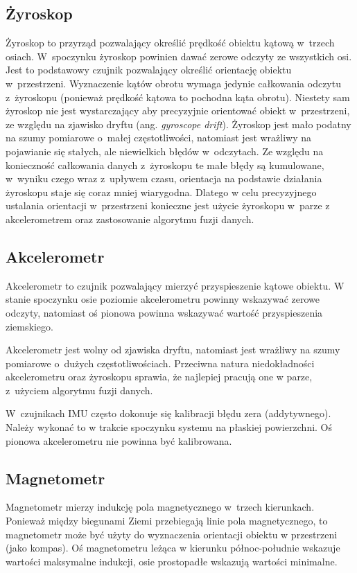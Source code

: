  \subsection{Żyroskop}
Żyroskop to przyrząd pozwalający określić prędkość obiektu kątową w~trzech
osiach.
W~spoczynku żyroskop powinien dawać zerowe odczyty ze wszystkich osi.
Jest to podstawowy czujnik pozwalający określić orientację obiektu
w~przestrzeni.
Wyznaczenie kątów obrotu wymaga jedynie całkowania odczytu z~żyroskopu
(ponieważ prędkość kątowa to pochodna kąta obrotu).
Niestety sam żyroskop nie jest wystarczający aby precyzyjnie orientować obiekt
w~przestrzeni, ze względu na zjawisko dryftu (ang. \textit{gyroscope drift}).
Żyroskop jest mało podatny na szumy pomiarowe o~małej częstotliwości, natomiast
jest wrażliwy na pojawianie się stałych, ale niewielkich błędów w~odczytach.
Ze względu na konieczność całkowania danych z~żyroskopu te małe błędy są
kumulowane, w~wyniku czego wraz z~upływem czasu, orientacja na podstawie
działania żyroskopu staje się coraz mniej wiarygodna.
Dlatego w celu precyzyjnego ustalania orientacji w~przestrzeni konieczne jest
użycie żyroskopu w~parze z akcelerometrem oraz zastosowanie algorytmu fuzji
danych.

 \subsection{Akcelerometr}
Akcelerometr to czujnik pozwalający mierzyć przyspieszenie kątowe obiektu.
W stanie spoczynku osie poziomie akcelerometru powinny wskazywać zerowe
odczyty, natomiast oś pionowa powinna wskazywać wartość przyspieszenia
ziemskiego.

Akcelerometr jest wolny od zjawiska dryftu, natomiast jest wrażliwy na szumy
pomiarowe o~dużych częstotliwościach.
Przeciwna natura niedokładności akcelerometru oraz żyroskopu sprawia, że
najlepiej pracują one w parze, z~użyciem algorytmu fuzji danych.

W~czujnikach IMU często dokonuje się kalibracji błędu zera (addytywnego).
Należy wykonać to w trakcie spoczynku systemu na płaskiej powierzchni.
Oś pionowa akcelerometru nie powinna być kalibrowana.

 \subsection{Magnetometr}
Magnetometr mierzy indukcję pola magnetycznego w~trzech kierunkach.
Ponieważ między biegunami Ziemi przebiegają linie pola magnetycznego, to
magnetometr może być użyty do wyznaczenia orientacji obiektu w przestrzeni
(jako kompas).
Oś magnetometru leżąca w kierunku północ-południe wskazuje wartości maksymalne
indukcji, osie prostopadłe wskazują wartości minimalne.

